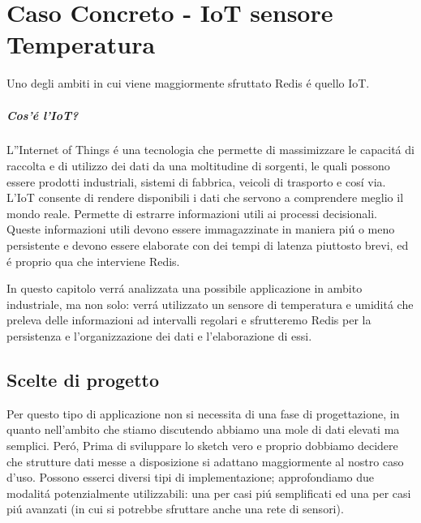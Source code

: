 \chapter{Caso Concreto - IoT sensore Temperatura}
Uno degli ambiti in cui viene maggiormente sfruttato Redis é quello IoT.
\paragraph{Cos'é l'IoT?\\}
L''Internet of Things é una tecnologia che permette di massimizzare le capacitá di raccolta e di utilizzo
dei dati da una moltitudine di sorgenti, le quali possono essere prodotti industriali, sistemi di fabbrica, veicoli
di trasporto e cosí via.
L'IoT consente di rendere disponibili i dati che servono a comprendere meglio il mondo reale.
Permette di estrarre informazioni utili ai processi decisionali.\\
Queste informazioni utili devono essere immagazzinate in maniera piú o meno persistente
e devono essere elaborate con dei tempi di latenza piuttosto brevi, ed é proprio qua che interviene Redis.

In questo capitolo verrá analizzata una possibile applicazione in ambito industriale, ma non solo:
verrá utilizzato un sensore di temperatura e umiditá che preleva delle informazioni ad intervalli regolari e
sfrutteremo Redis per la persistenza e l'organizzazione dei dati e l'elaborazione di essi.

\section{Scelte di progetto}
Per questo tipo di applicazione non si necessita di una fase di progettazione, in quanto
nell'ambito che stiamo discutendo abbiamo una mole di dati elevati ma semplici.
Peró, Prima di sviluppare lo sketch vero e proprio dobbiamo decidere che strutture dati messe a disposizione si adattano
maggiormente al nostro caso d'uso.
Possono esserci diversi tipi di implementazione; approfondiamo due modalitá potenzialmente utilizzabili:
una per casi piú semplificati ed una per casi piú avanzati (in cui si potrebbe sfruttare anche una rete di sensori).

